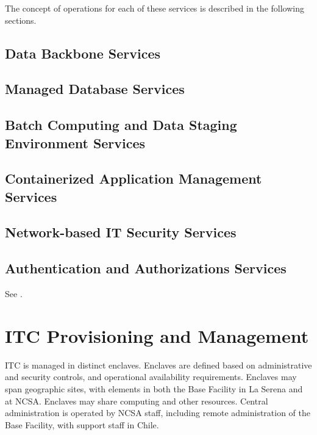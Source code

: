 The concept of operations for each of these services is described in the
following sections.

\subsection{Data Backbone Services}


\subsection{Managed Database Services}


\subsection{Batch Computing and Data Staging Environment Services}


\subsection{Containerized Application Management Services}


\subsection{Network-based IT Security Services}


\subsection{Authentication and Authorizations Services}
See .

\section{ITC Provisioning and Management}

ITC is managed in distinct enclaves. Enclaves are defined based on administrative
and security controls, and operational availability requirements. Enclaves may
span geographic sites, with elements in both the Base Facility in La Serena and
at NCSA. Enclaves may share computing and other resources.
Central administration is operated by NCSA staff, including remote administration of the Base Facility,
with support staff in Chile.

